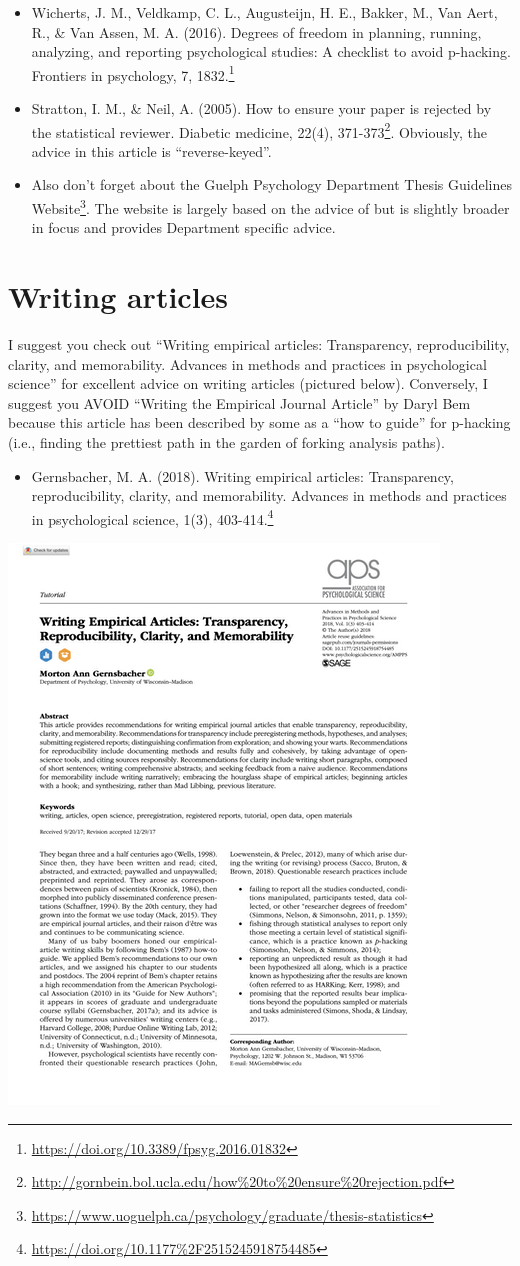 \documentclass[
]{krantz}
\providecommand{\tightlist}{%
  \setlength{\itemsep}{0pt}\setlength{\parskip}{0pt}}
\renewcommand{\href}[2]{#2\footnote{\url{#1}}}
\begin{document}
\begin{itemize}
\item
  \href{https://doi.org/10.3389/fpsyg.2016.01832}{Wicherts, J. M., Veldkamp, C. L., Augusteijn, H. E., Bakker, M., Van Aert, R., \& Van Assen, M. A. (2016). Degrees of freedom in planning, running, analyzing, and reporting psychological studies: A checklist to avoid p-hacking. Frontiers in psychology, 7, 1832.}
\item
  \href{http://gornbein.bol.ucla.edu/how\%20to\%20ensure\%20rejection.pdf}{Stratton, I. M., \& Neil, A. (2005). How to ensure your paper is rejected by the statistical reviewer. Diabetic medicine, 22(4), 371-373}. Obviously, the advice in this article is ``reverse-keyed''.
\item
  Also don't forget about the \href{https://www.uoguelph.ca/psychology/graduate/thesis-statistics}{Guelph Psychology Department Thesis Guidelines Website}. The website is largely based on the advice of \citep{wicherts2016degrees} but is slightly broader in focus and provides Department specific advice.
\end{itemize}

\hypertarget{writing-articles}{%
\section{Writing articles}\label{writing-articles}}

I suggest you check out \citep{gernsbacher2018writing} ``Writing empirical articles: Transparency, reproducibility, clarity, and memorability. Advances in methods and practices in psychological science'' for excellent advice on writing articles (pictured below). Conversely, I suggest you AVOID ``Writing the Empirical Journal Article'' by Daryl Bem because this article has been described by some as a ``how to guide'' for p-hacking (i.e., finding the prettiest path in the garden of forking analysis paths).

\begin{itemize}
\tightlist
\item
  \href{https://doi.org/10.1177\%2F2515245918754485}{Gernsbacher, M. A. (2018). Writing empirical articles: Transparency, reproducibility, clarity, and memorability. Advances in methods and practices in psychological science, 1(3), 403-414.}
\end{itemize}

\includegraphics[width=0.5\linewidth]{images/gernsbacher}
\end{document}
